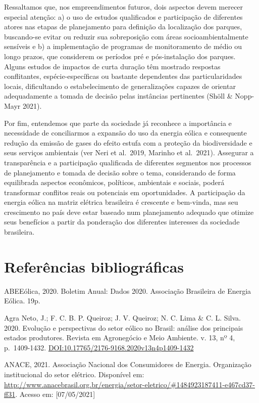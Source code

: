 \documentclass[
  oneside]{scrbook}
\begin{document}
Ressaltamos que, nos empreendimentos futuros, dois aspectos devem merecer especial atenção: a) o uso de estudos qualificados e participação de diferentes atores nas etapas de planejamento para definição da localização dos parques, buscando-se evitar ou reduzir sua sobreposição com áreas socioambientalmente sensíveis e b) a implementação de programas de monitoramento de médio ou longo prazos, que considerem os períodos pré e pós-instalação dos parques. Alguns estudos de impactos de curta duração têm mostrado respostas conflitantes, espécie-específicas ou bastante dependentes das particularidades locais, dificultando o estabelecimento de generalizações capazes de orientar adequadamente a tomada de decisão pelas instâncias pertinentes (Shöll \& Nopp-Mayr 2021).

Por fim, entendemos que parte da sociedade já reconhece a importância e necessidade de conciliarmos a expansão do uso da energia eólica e consequente redução da emissão de gases do efeito estufa com a proteção da biodiversidade e seus serviços ambientais (ver Neri et al.~2019, Marinho et al.~2021). Assegurar a transparência e a participação qualificada de diferentes segmentos nos processos de planejamento e tomada de decisão sobre o tema, considerando de forma equilibrada aspectos econômicos, políticos, ambientais e sociais, poderá transformar conflitos reais ou potenciais em oportunidades. A participação da energia eólica na matriz elétrica brasileira é crescente e bem-vinda, mas seu crescimento no país deve estar baseado num planejamento adequado que otimize seus benefícios a partir da ponderação dos diferentes interesses da sociedade brasileira.

\hypertarget{referuxeancias-bibliogruxe1ficas}{%
\section{Referências bibliográficas}\label{referuxeancias-bibliogruxe1ficas}}

ABEEólica, 2020. Boletim Anual: Dados 2020. Associação Brasileira de Energia Eólica. 19p.

Agra Neto, J.; F. C. B. P. Queiroz; J. V. Queiroz; N. C. Lima \& C. L. Silva. 2020. Evolução e perspectivas do setor eólico no Brasil: análise dos principais estados produtores. Revista em Agronegócio e Meio Ambiente. v. 13, nº 4, p.~1409-1432. \url{DOI:10.17765/2176-9168.2020v13n4p1409-1432}

ANACE, 2021. Associação Nacional dos Consumidores de Energia. Organização institucional do setor elétrico. Disponível em: \url{http://www.anacebrasil.org.br/energia/setor-eletrico/\#1484923187411-e467cd37-ff31}. Acesso em: {[}07/05/2021{]}
\end{document}
